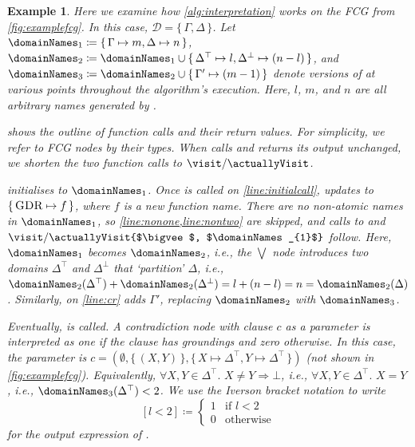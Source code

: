 \documentclass{article}
\newtheorem{example}{Example}
\newcommand{\Done}{\domainNames_{1}}
\newcommand{\Dtwo}{\domainNames_{2}}
\newcommand{\Dthree}{\domainNames_{3}}
\DeclareMathOperator{\CR}{\textsc{CR}}
\DeclareMathOperator{\GDR}{\textsc{GDR}}
\begin{document}
\begin{example}\label{example:interpretation}
  Here we examine how \cref{alg:interpretation} works on the FCG from
  \cref{fig:examplefcg}. In this case, $\mathcal{D} = \{\, \Gamma, \Delta \,\}$.
  Let $\Done \coloneqq \{\, \Gamma \mapsto m, \Delta \mapsto n \,\}$,
  $\Dtwo \coloneqq \Done \cup \{\, \Delta^{\top} \mapsto l, \Delta^{\bot} \mapsto (n-l) \,\}$,
  and $\Dthree \coloneqq \Dtwo \cup \{\, \Gamma' \mapsto (m-1) \,\}$ denote
  versions of \domainNames at various points throughout the algorithm's
  execution. Here, $l$, $m$, and $n$ are all arbitrary names generated by
  \newDomainName.

   shows the outline of function calls and their return
  values. For simplicity, we refer to FCG nodes by their types. When \visit
  calls \actuallyVisit and returns its output unchanged, we shorten the two
  function calls to $\visit/\actuallyVisit$.

   initialises \domainNames to $\Done$. Once \visit{$\GDR$,
    $\Done$} is called on \cref{line:initialcall}, \newFunctionName updates
  \functionNames to $\{\, \GDR \mapsto f \,\}$, where $f$ is a new function
  name. There are no non-atomic names in $\Done$, so
  \cref{line:nonone,line:nontwo} are skipped, and calls to
  \actuallyVisit{$\GDR$, $\Done$} and
  $\visit/\actuallyVisit{$\bigvee$, $\Done$}$ follow. Here, $\Done$ becomes
  $\Dtwo$, i.e., the $\bigvee$ node introduces two domains $\Delta^{\top}$ and
  $\Delta^{\bot}$ that `partition' $\Delta$, i.e.,
  $\Dtwo(\Delta^{\top}) + \Dtwo(\Delta^{\bot}) = l + (n-l) = n = \Dtwo(\Delta)$.
  Similarly, \actuallyVisit{$\CR$, $\Dtwo$} on \cref{line:cr} adds $\Gamma'$,
  replacing $\Dtwo$ with $\Dthree$.

  Eventually, \actuallyVisit{$\bot$, $\Dthree$} is called. A contradiction node
  with clause $c$ as a parameter is interpreted as one if the clause has
  groundings and zero otherwise. In this case, the parameter is
  $c = (\emptyset, \{\, (X, Y) \,\}, \{\, X \mapsto \Delta^\top, Y \mapsto \Delta^\top \,\})$
  (not shown in \cref{fig:examplefcg}). Equivalently,
  $\forall X, Y \in \Delta^{\top}\text{. }X \ne Y \Rightarrow \bot$, i.e.,
  $\forall X, Y \in \Delta^{\top}\text{. }X = Y$, i.e.,
  $\Dthree(\Delta^{\top}) < 2$. We use the Iverson bracket notation to write
  \[
    [l < 2] \coloneqq
    \begin{cases}
      1 & \text{if } l < 2 \\
      0 & \text{otherwise}
    \end{cases}
  \]
  for the output expression of \actuallyVisit{$\bot$, $\Dthree$}.


\end{example}
\end{document}
